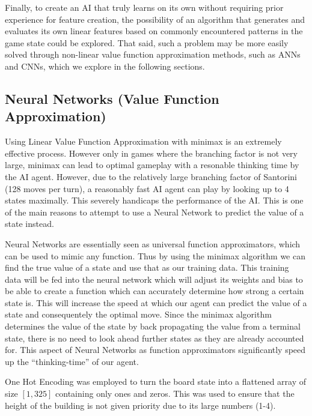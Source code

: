 \documentclass[a4paper,12pt,table]{article}
\begin{document}
Finally, to create an AI that truly learns on its own without requiring prior experience for feature creation, the possibility of an algorithm that generates and evaluates its own linear features based on commonly encountered patterns in the game state could be explored. That said, such a problem may be more easily solved through non-linear value function approximation methods, such as ANNs and CNNs, which we explore in the following sections. \par


\subsection{Neural Networks (Value Function Approximation)}

Using Linear Value Function Approximation with minimax is an extremely effective process. However only in games where the branching factor is not very large, minimax can lead to optimal gameplay with a resonable thinking time by the AI agent. However, due to the relatively large branching factor of Santorini (128 moves per turn), a reasonably fast AI agent can play by looking up to 4 states maximally. This severely handicaps the performance of the AI. This is one of the main reasons to attempt to use a Neural Network to predict the value of a state instead. \par

Neural Networks are essentially seen as universal function approximators, which can be used to mimic any function. Thus by using the minimax algorithm we can find the true value of a state and use that as our training data. This training data will be fed into the neural network which will adjust its weights and bias to be able to create a function which can accurately determine how strong a certain state is. This will increase the speed at which our agent can predict the value of a state and consequentely the optimal move. Since the minimax algorithm determines the value of the state by back propagating the value from a terminal state, there is no need to look ahead further states as they are already accounted for. This aspect of Neural Networks as function approximators significantly speed up the “thinking-time” of our agent. \par

One Hot Encoding was employed to turn the board state into a flattened array of size $[1,325]$ containing only ones and zeros. This was used to ensure that the height of the building is not given priority due to its large numbers (1-4). \par
\end{document}

